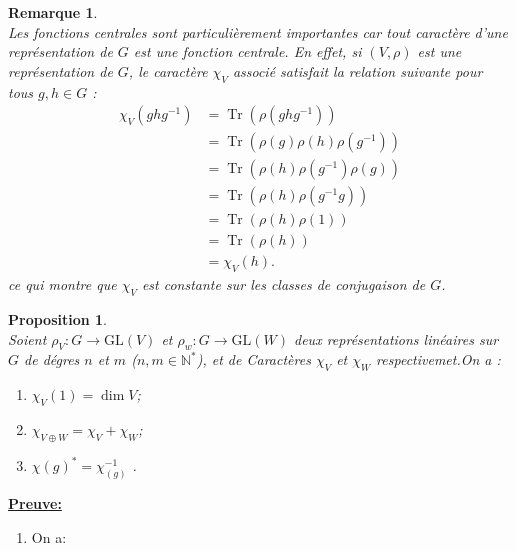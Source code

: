 \documentclass[a4paper, 14pt]{report}
\newtheorem{remark}{Remarque}[section]
\newtheorem{proposition}{Proposition}[section]
\begin{document}
\begin{onehalfspace}
{			\begin{remark} \cite{renard2009groupes}\\
				Les fonctions centrales sont particulièrement importantes car tout caractère d'une représentation de $G$ est une fonction centrale. En effet, si $(V, \rho)$ est une représentation de $G$, le caractère $\chi_V$ associé satisfait la relation suivante pour tous $g, h \in G$ :
				\begin{align*}
					\chi_V(ghg^{-1}) &= \operatorname{Tr}(\rho(ghg^{-1})) \\
					&= \operatorname{Tr}(\rho(g) \rho(h)\rho(g^{-1})) \\ 
					&= \operatorname{Tr}(\rho(h)\rho(g^{-1}) \rho(g) ) \\ 
					&= \operatorname{Tr}(\rho(h)\rho(g^{-1}g)) \\
					&= \operatorname{Tr}(\rho(h)\rho(1)) \\
					&= \operatorname{Tr}(\rho(h)) \\
					&= \chi_V(h).
				\end{align*}
				ce qui montre que $\chi_V$ est constante sur les classes de conjugaison de $G$.
			\end{remark}
			
			
			\begin{proposition} \cite{serre1971representation} \\
				Soient \( \rho_V : G \rightarrow \mathrm{GL}(V) \) et \( \rho_w : G \rightarrow \mathrm{GL}(W) \) deux représentations linéaires sur \(G\) de dégres \(n\) et \(m\) (\(n,m \in \mathbb{N^*}\)), et de Caractères \( \chi_V \) et \(\chi_W \)  respectivemet.On a :
				\begin{enumerate}[label=\roman*)]
					\item \( \chi_V(1) = \dim V \);
					\item \( \chi_{V \oplus W} = \chi_V + \chi_W \);
					\item \( \chi{(g)^*} = {\chi_{(g)}^{-1}} \) \quad {}. 
				\end{enumerate}
			\end{proposition}
			
			
			\textbf{\underline{Preuve:}} 
			\begin{enumerate}[label=\roman*)]
				\item On a:
				

\end{enumerate}}
\end{onehalfspace}
\end{document}
